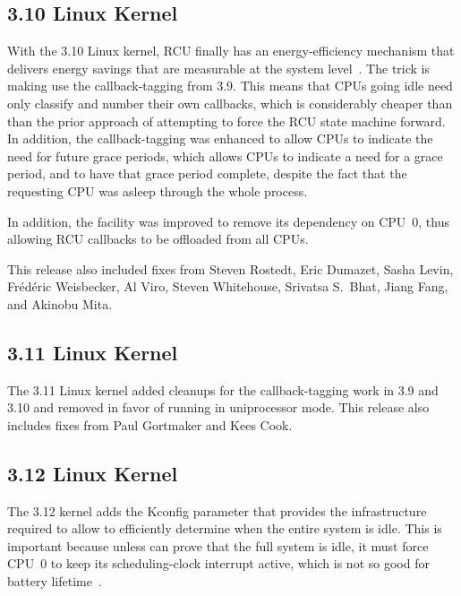 \subsection{3.10 Linux Kernel}

With the 3.10 Linux kernel, RCU finally has an energy-efficiency mechanism
that delivers energy savings that are measurable at the system
level~\cite{PaulMcKenney2013AMPenergyHOTPAR}.
The trick is making  use the callback-tagging from
3.9.
This means that CPUs going idle need only classify and number their own
callbacks, which is considerably cheaper than than the prior approach
of attempting to force the RCU state machine forward.
In addition, the callback-tagging was enhanced to allow CPUs to indicate
the need for future grace periods, which allows CPUs to indicate a need
for a grace period, and to have that grace period complete, despite the
fact that the requesting CPU was asleep through the whole process.

In addition, the  facility was improved to
remove its dependency on CPU~0, thus allowing RCU callbacks to be offloaded
from all CPUs.

This release also included fixes from Steven Rostedt, Eric Dumazet,
Sasha Levin, Fr\'ed\'eric Weisbecker, Al Viro, Steven Whitehouse,
Srivatsa S.~Bhat, Jiang Fang, and Akinobu Mita.

\subsection{3.11 Linux Kernel}

The 3.11 Linux kernel added cleanups for the callback-tagging work
in 3.9 and 3.10 and removed  in favor of running
 in uniprocessor mode.
This release also includes fixes from Paul Gortmaker and Kees Cook.

\subsection{3.12 Linux Kernel}

The 3.12 kernel adds the  Kconfig
parameter that provides the infrastructure required to allow
 to efficiently determine when the entire
system is idle.
This is important because unless  can prove
that the full system is idle, it must force CPU~0 to keep its
scheduling-clock interrupt active, which is not so good for battery
lifetime~\cite{JonathanCorbet2013SYSIDLE}.

